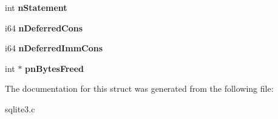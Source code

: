 \begin{DoxyCompactItemize}
\item 
int {\bfseries n\+Statement}\hypertarget{structsqlite3_a727c6da42aa4313c715de350303c90f6}{}\label{structsqlite3_a727c6da42aa4313c715de350303c90f6}

\item 
i64 {\bfseries n\+Deferred\+Cons}\hypertarget{structsqlite3_a1d74627daa6fe93811e99cffe9362c10}{}\label{structsqlite3_a1d74627daa6fe93811e99cffe9362c10}

\item 
i64 {\bfseries n\+Deferred\+Imm\+Cons}\hypertarget{structsqlite3_a784716abd1e79a084257ad5c6da7ebb5}{}\label{structsqlite3_a784716abd1e79a084257ad5c6da7ebb5}

\item 
int $\ast$ {\bfseries pn\+Bytes\+Freed}\hypertarget{structsqlite3_a5559fb199b06ee59b635bb18f153fcf8}{}\label{structsqlite3_a5559fb199b06ee59b635bb18f153fcf8}

\end{DoxyCompactItemize}


The documentation for this struct was generated from the following file\+:\begin{DoxyCompactItemize}
\item 
sqlite3.\+c\end{DoxyCompactItemize}
